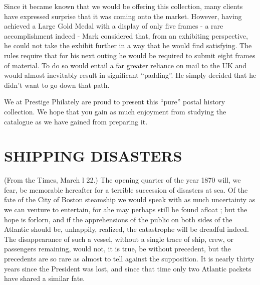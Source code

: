 \documentclass[justified]{tufte-book}
\begin{document}
Since it became known that we would be offering this collection, many clients have expressed surprise that it was coming onto the market.  However, having achieved a Large Gold Medal with a display of only five frames  -  a rare accomplishment indeed  -  Mark considered that, from an exhibiting perspective, he could not take the exhibit further in a way that he would find satisfying.  The rules require that for his next outing he would be required to submit eight frames of material.  To do so would entail a far greater reliance on mail to the UK and would almost inevitably result in significant “padding”.  He simply decided that he didn't want to go down that path.

We at Prestige Philately are proud to present this ``pure'' postal history collection.  We hope that you gain as much enjoyment from studying the catalogue as we have gained from preparing it.


\chapter{SHIPPING DISASTERS}

(From the Times, March l 22.) The opening quarter of the year 1870 will, we fear, be memorable hereafter for a terrible succession of disasters at sea. Of the fate of the City of Boston steamship we would speak with as much uncertainty as we can venture to entertain, for ahe may perhaps still be found afloat ; but the hope is forlorn, and if the apprehensions of the public on both sides of the Atlantic should be, unhappily, realized, the catastrophe will be dreadful indeed. The disappearance of such a vessel, without a single trace of ship, crew, or passengers remaining, would not, it is true, be without precedent, but the precedents are so rare as almost to tell against the supposition. It is nearly thirty years since the President was lost, and since that time only two Atlantic packets have shared a similar fate. 
\end{document}
